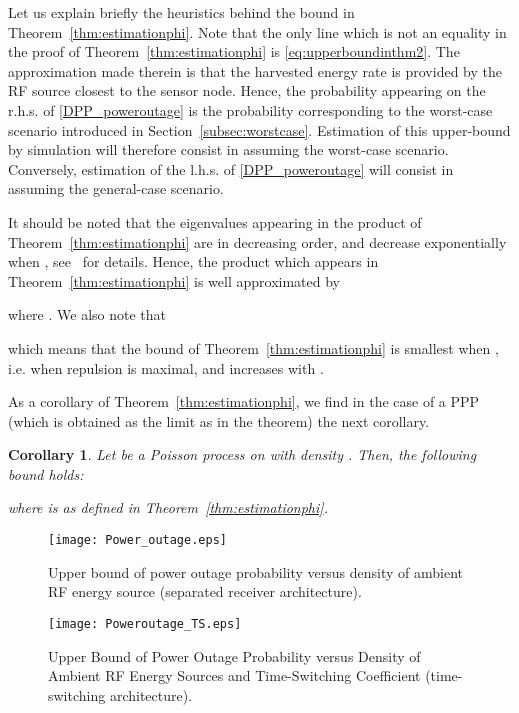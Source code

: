 \documentclass[12pt,draftclsnofoot,onecolumn]{IEEEtran}
\newtheorem{corollary}{Corollary}
\begin{document}
Let us explain briefly the heuristics behind the bound in Theorem~\ref{thm:estimationphi}. Note that the only line which is not an equality in the proof of Theorem~\ref{thm:estimationphi} is \eqref{eq:upperboundinthm2}. The approximation made therein is that the harvested energy rate  is provided by the RF source closest to the sensor node. Hence, the probability appearing on the r.h.s. of \eqref {DPP_poweroutage} is the probability corresponding to the worst-case scenario introduced in Section~\ref{subsec:worstcase}. Estimation of this upper-bound by simulation will therefore consist in assuming the worst-case scenario. Conversely, estimation of the l.h.s. of \eqref{DPP_poweroutage} will consist in assuming the general-case scenario.

It should be noted that the eigenvalues appearing in the product of Theorem~\ref{thm:estimationphi} are in decreasing order, and decrease exponentially when , see~\cite{DecreusefondFlintVergne} for details. Hence, the product which appears in Theorem~\ref{thm:estimationphi} is well approximated by 

 where .
We also note that

which means that the bound of Theorem~\ref{thm:estimationphi} is smallest when , i.e. when repulsion is maximal, and increases with . 

As a corollary of Theorem~\ref{thm:estimationphi}, we find in the case of a PPP (which is obtained as the limit as  in the theorem) the next corollary.
\begin{corollary}
Let  be a Poisson process on  with density . Then, the following bound holds:

where  is as defined in Theorem~\ref{thm:estimationphi}.
\end{corollary}

 \begin{figure}
 \centering
  \begin{minipage}[c]{0.48\textwidth}
          \texttt{[image: Power\_outage.eps]}
           \caption{Upper bound of power outage probability versus density of ambient RF energy source (separated receiver architecture).}  \label{fig:power_outage}          
    \end{minipage}
  \begin{minipage}[c]{0.48\textwidth}
          \texttt{[image: Poweroutage\_TS.eps]}
            \caption{Upper Bound of Power Outage Probability versus Density of Ambient RF  Energy Sources and Time-Switching Coefficient  (time-switching architecture).}\label{fig:power_outage_TS}        
  \end{minipage}
  \end{figure}
  
\end{document}
